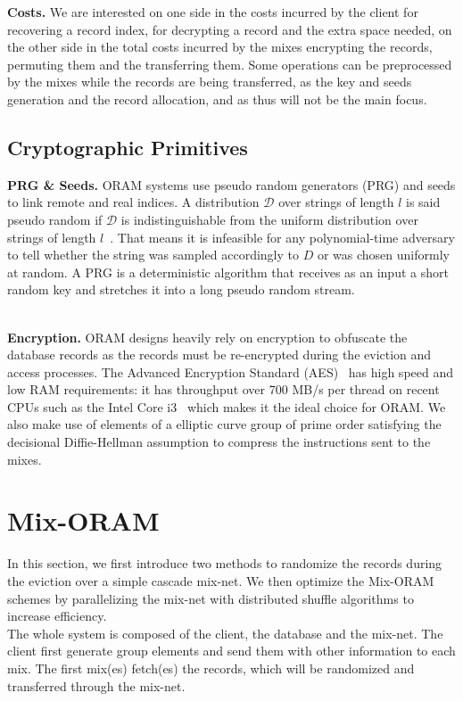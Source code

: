 \documentclass[USenglish,oneside,twocolumn]{article}
\begin{document}
\noindent\textbf{Costs.} We are interested on one side in the costs incurred by the client for recovering a record index, for decrypting a record and the extra space needed, on the other side in the total costs incurred by the mixes encrypting the records, permuting them and the transferring them.
Some operations can be preprocessed by the mixes while the records are being transferred, as the key and seeds generation and the record allocation, and as thus will not be the main focus.
%
\subsection{Cryptographic Primitives}

\noindent\textbf{PRG \& Seeds.}
ORAM systems use pseudo random generators (PRG) and seeds to link remote and real indices. A distribution $\mathcal{D}$ over strings of length $l$ is said pseudo random if $\mathcal{D}$ is indistinguishable from the uniform distribution over strings of length $l$~\cite{katz2014introduction}. That means it is infeasible for any polynomial-time adversary to tell whether the string was sampled accordingly to $D$ or was chosen uniformly at random. A PRG is a deterministic algorithm that receives as an input a short random key and stretches it into a long pseudo random stream.\\\

\noindent\textbf{Encryption.}
ORAM designs heavily rely on encryption  to obfuscate the database records as the records must be re-encrypted during the eviction and access processes.
The Advanced Encryption Standard (AES)~\cite{daemen2013design} has high speed and low RAM requirements: it has throughput over 700 MB/s per thread on recent CPUs such as the Intel Core i3~\cite{mcwilliams2014hardware} which makes it the ideal choice for ORAM.
We also make use of elements of a elliptic curve group of prime order satisfying the decisional Diffie-Hellman assumption to compress the instructions sent to the mixes.
%
\section{Mix-ORAM}\label{Mix-ORAM}
In this section, we first introduce two methods to randomize the records during the eviction over a simple cascade mix-net. We then optimize the Mix-ORAM schemes by parallelizing the mix-net with distributed shuffle algorithms to increase efficiency.\\


The whole system is composed of the client, the database and the mix-net.
The client first generate group elements and send them with other information to each mix. The first mix(es) fetch(es) the records, which will be randomized and transferred through the mix-net. 
\end{document}
